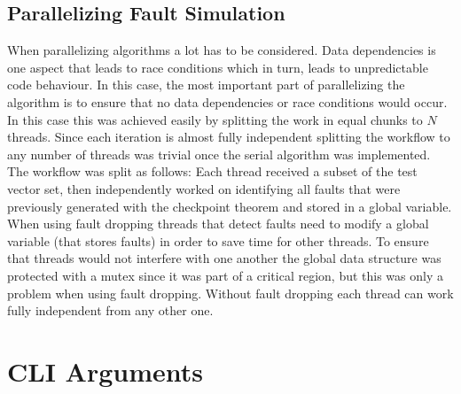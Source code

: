 \documentclass[a4paper,12pt]{article}
\begin{document}
\subsection*{Parallelizing Fault Simulation}
When parallelizing algorithms a lot has to be considered. Data dependencies is one aspect that leads to race conditions which in turn, leads to unpredictable code behaviour. In this case, the most important part of parallelizing the algorithm is to ensure that no data dependencies or race conditions would occur. In this case this was achieved easily by splitting the work in equal chunks to $N$ threads. Since each iteration is almost fully independent splitting the workflow to any number of threads was trivial once the serial algorithm was implemented. The workflow was split as follows: Each thread received a subset of the test vector set, then independently worked on identifying all faults that were previously generated with the checkpoint theorem and stored in a global variable. When using fault dropping threads that detect faults need to modify a global variable (that stores faults) in order to save time for other threads. To ensure that threads would not interfere with one another the global data structure was protected with a mutex since it was part of a critical region, but this was only a problem when using fault dropping. Without fault dropping each thread can work fully independent from any other one.

\clearpage


\section*{CLI Arguments}
\end{document}
